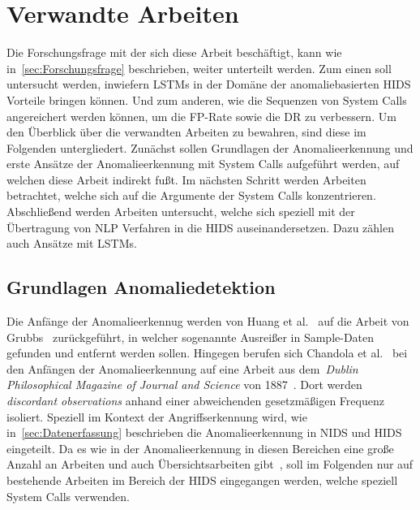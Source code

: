 \chapter{Verwandte Arbeiten}\label{ch:verwandte_arbeiten}

Die Forschungsfrage mit der sich diese Arbeit beschäftigt, kann wie in~\autoref{sec:Forschungsfrage} beschrieben, weiter unterteilt werden.
Zum einen soll untersucht werden, inwiefern \acp{LSTM} in der Domäne der anomaliebasierten \ac{HIDS} Vorteile bringen können.
Und zum anderen, wie die Sequenzen von System Calls angereichert werden können, um die \acf{FP}-Rate sowie die \acf{DR} zu verbessern.
Um den Überblick über die verwandten Arbeiten zu bewahren, sind diese im Folgenden untergliedert.
Zunächst sollen Grundlagen der Anomalieerkennung und erste Ansätze der Anomalieerkennung mit System Calls aufgeführt werden, auf welchen diese Arbeit indirekt fußt.
Im nächsten Schritt werden Arbeiten betrachtet, welche sich auf die Argumente der System Calls konzentrieren.
Abschließend werden Arbeiten untersucht, welche sich speziell mit der Übertragung von \ac{NLP} Verfahren in die \ac{HIDS} auseinandersetzen.
Dazu zählen auch Ansätze mit \acp{LSTM}.

    \section{Grundlagen Anomaliedetektion}

        Die Anfänge der Anomalieerkennug werden von Huang et al.~\cite{ANOMALYBOOKKISHAN2017} auf die Arbeit von Grubbs~\cite{ANOMALYDEFINITION1969} zurückgeführt, in welcher sogenannte Ausreißer in Sample-Daten gefunden und entfernt werden sollen.
        Hingegen berufen sich Chandola et al.~\cite{ANOMALYSURVEY} bei den Anfängen der Anomalieerkennung auf eine Arbeit aus dem~\textit{Dublin Philosophical Magazine of Journal and Science} von 1887~\cite{ANOMALYDEFINITION1887}.
        Dort werden \textit{discordant observations} anhand einer abweichenden gesetzmäßigen Frequenz isoliert. 
        Speziell im Kontext der Angriffserkennung wird, wie in~\autoref{sec:Datenerfassung} beschrieben die Anomalieerkennung in \ac{NIDS} und \ac{HIDS} eingeteilt.
        Da es wie in der Anomalieerkennung in diesen Bereichen eine große Anzahl an Arbeiten und auch Übersichtsarbeiten gibt~\cite{ANOMALYSURVEY, ANOMALYSURVEY2, ANOMALYSURVEY3}, soll im Folgenden nur auf bestehende Arbeiten im Bereich der \ac{HIDS} eingegangen werden, welche speziell System Calls verwenden.

